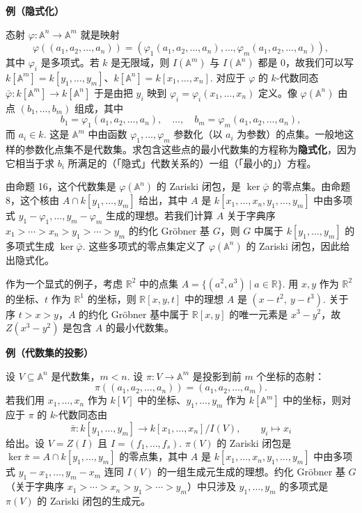 \noindent\textbf{例（隐式化）}

态射 \(\varphi : \mathbb{A}^n \to \mathbb{A}^m\) 就是映射
\[
\varphi((a_1, a_2, \ldots, a_n)) = (\varphi_1(a_1, a_2, \ldots, a_n), \ldots, \varphi_m(a_1, a_2, \ldots, a_n)),
\]
其中 \(\varphi_i\) 是多项式。若 \(k\) 是无限域，则 \(I(\mathbb{A}^m)\) 与 \(I(\mathbb{A}^n)\) 都是 0，故我们可以写 \(k[\mathbb{A}^m] = k[y_1, \ldots, y_m]\)、\(k[\mathbb{A}^n] = k[x_1, \ldots, x_n]\). 对应于 \(\varphi\) 的 \(k\)-代数同态 \(\bar\varphi : k[\mathbb{A}^m] \to k[\mathbb{A}^n]\) 于是由把 \(y_i\) 映到 \(\varphi_i = \varphi_i(x_1, \ldots, x_n)\) 定义。像 \(\varphi(\mathbb{A}^n)\) 由点 \((b_1, \ldots, b_m)\) 组成，其中
\[
b_1 = \varphi_1(a_1, a_2, \ldots, a_n), \quad \ldots, \quad b_m = \varphi_m(a_1, a_2, \ldots, a_n),
\]
而 \(a_i \in k\). 这是 \(\mathbb{A}^m\) 中由函数 \(\varphi_1, \ldots, \varphi_m\) 参数化（以 \(a_i\) 为参数）的点集。一般地这样的参数化点集不是代数集。求包含这些点的最小代数集的方程称为\textbf{隐式化}，因为它相当于求 \(b_i\) 所满足的（「隐式」代数关系的）一组（「最小的」）方程。

由命题 16，这个代数集是 \(\varphi(\mathbb{A}^n)\) 的 Zariski 闭包，是 \(\ker\bar\varphi\) 的零点集。由命题 8，这个核由 \(A \cap k[y_1, \ldots, y_m]\) 给出，其中 \(A\) 是 \(k[x_1, \ldots, x_n, y_1, \ldots, y_m]\) 中由多项式 \(y_1-\varphi_1, \ldots, y_m-\varphi_m\) 生成的理想。若我们计算 \(A\) 关于字典序 \(x_1 > \cdots > x_n > y_1 > \cdots > y_m\) 的约化 Gröbner 基 \(G\)，则 \(G\) 中属于 \(k[y_1, \ldots, y_m]\) 的多项式生成 \(\ker\bar\varphi\). 这些多项式的零点集定义了 \(\varphi(\mathbb{A}^n)\) 的 Zariski 闭包，因此给出隐式化。

作为一个显式的例子，考虑 \(\mathbb{R}^2\) 中的点集 \(A = \{(a^2, a^3) \mid a \in \mathbb{R}\}\). 用 \(x, y\) 作为 \(\mathbb{R}^2\) 的坐标、\(t\) 作为 \(\mathbb{R}^1\) 的坐标，则 \(\mathbb{R}[x,y,t]\) 中的理想 \(A\) 是 \((x-t^2,\ y-t^3)\). 关于序 \(t > x > y\)，\(A\) 的约化 Gröbner 基中属于 \(\mathbb{R}[x,y]\) 的唯一元素是 \(x^3-y^2\)，故 \(Z(x^3-y^2)\) 是包含 \(A\) 的最小代数集。

\noindent\textbf{例（代数集的投影）}

设 \(V \subseteq \mathbb{A}^n\) 是代数集，\(m < n\). 设 \(\pi : V \to \mathbb{A}^m\) 是投影到前 \(m\) 个坐标的态射：
\[
\pi((a_1, a_2, \ldots, a_n)) = (a_1, a_2, \ldots, a_m).
\]
若我们用 \(x_1, \ldots, x_n\) 作为 \(k[V]\) 中的坐标、\(y_1, \ldots, y_m\) 作为 \(k[\mathbb{A}^m]\) 中的坐标，则对应于 \(\pi\) 的 \(k\)-代数同态由
\[
\bar\pi : k[y_1, \ldots, y_m] \to k[x_1, \ldots, x_n]/I(V), \qquad y_i \mapsto x_i
\]
给出。设 \(V = Z(I)\) 且 \(I = (f_1, \ldots, f_s)\). \(\pi(V)\) 的 Zariski 闭包是 \(\ker\bar\pi = A \cap k[y_1, \ldots, y_m]\) 的零点集，其中 \(A\) 是 \(k[x_1, \ldots, x_n, y_1, \ldots, y_m]\) 中由多项式 \(y_1-x_1, \ldots, y_m-x_m\) 连同 \(I(V)\) 的一组生成元生成的理想。约化 Gröbner 基 \(G\)（关于字典序 \(x_1 > \cdots > x_n > y_1 > \cdots > y_m\)）中只涉及 \(y_1, \ldots, y_m\) 的多项式是 \(\pi(V)\) 的 Zariski 闭包的生成元。

